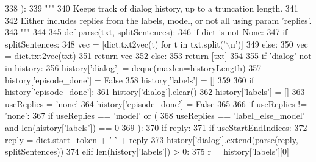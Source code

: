 \begin{DoxyCode}
338 ):
339     \textcolor{stringliteral}{"""}
340 \textcolor{stringliteral}{    Keeps track of dialog history, up to a truncation length.}
341 \textcolor{stringliteral}{}
342 \textcolor{stringliteral}{    Either includes replies from the labels, model, or not all using param 'replies'.}
343 \textcolor{stringliteral}{    """}
344 
345     \textcolor{keyword}{def }parse(txt, splitSentences):
346         \textcolor{keywordflow}{if} dict \textcolor{keywordflow}{is} \textcolor{keywordflow}{not} \textcolor{keywordtype}{None}:
347             \textcolor{keywordflow}{if} splitSentences:
348                 vec = [dict.txt2vec(t) \textcolor{keywordflow}{for} t \textcolor{keywordflow}{in} txt.split(\textcolor{stringliteral}{'\(\backslash\)n'})]
349             \textcolor{keywordflow}{else}:
350                 vec = dict.txt2vec(txt)
351             \textcolor{keywordflow}{return} vec
352         \textcolor{keywordflow}{else}:
353             \textcolor{keywordflow}{return} [txt]
354 
355     \textcolor{keywordflow}{if} \textcolor{stringliteral}{'dialog'} \textcolor{keywordflow}{not} \textcolor{keywordflow}{in} history:
356         history[\textcolor{stringliteral}{'dialog'}] = deque(maxlen=historyLength)
357         history[\textcolor{stringliteral}{'episode\_done'}] = \textcolor{keyword}{False}
358         history[\textcolor{stringliteral}{'labels'}] = []
359 
360     \textcolor{keywordflow}{if} history[\textcolor{stringliteral}{'episode\_done'}]:
361         history[\textcolor{stringliteral}{'dialog'}].clear()
362         history[\textcolor{stringliteral}{'labels'}] = []
363         useReplies = \textcolor{stringliteral}{'none'}
364         history[\textcolor{stringliteral}{'episode\_done'}] = \textcolor{keyword}{False}
365 
366     \textcolor{keywordflow}{if} useReplies != \textcolor{stringliteral}{'none'}:
367         \textcolor{keywordflow}{if} useReplies == \textcolor{stringliteral}{'model'} \textcolor{keywordflow}{or} (
368             useReplies == \textcolor{stringliteral}{'label\_else\_model'} \textcolor{keywordflow}{and} len(history[\textcolor{stringliteral}{'labels'}]) == 0
369         ):
370             \textcolor{keywordflow}{if} reply:
371                 \textcolor{keywordflow}{if} useStartEndIndices:
372                     reply = dict.start\_token + \textcolor{stringliteral}{' '} + reply
373                 history[\textcolor{stringliteral}{'dialog'}].extend(parse(reply, splitSentences))
374         \textcolor{keywordflow}{elif} len(history[\textcolor{stringliteral}{'labels'}]) > 0:
375             r = history[\textcolor{stringliteral}{'labels'}][0]

\end{DoxyCode}
